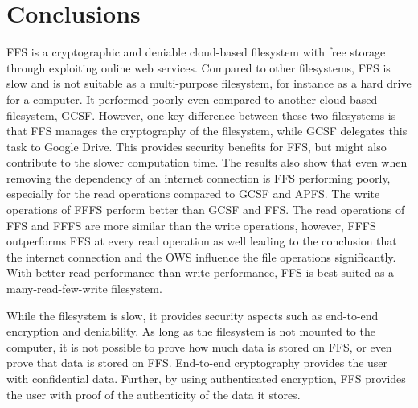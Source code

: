 
\section{Conclusions}
\label{sec:conclusions}
  


\gls{FFS} is a cryptographic and deniable \mbox{cloud-based} filesystem with free storage through exploiting online web services. Compared to other filesystems, \gls{FFS} is slow and is not suitable as a \mbox{multi-purpose} filesystem, for instance as a hard drive for a computer. It performed poorly even compared to another \mbox{cloud-based} filesystem, \gls{GCSF}. However, one key difference between these two filesystems is that \gls{FFS} manages the cryptography of the filesystem, while \gls{GCSF} delegates this task to Google Drive. This provides security benefits for \gls{FFS}, but might also contribute to the slower computation time. The results also show that even when removing the dependency of an internet connection is \gls{FFS} performing poorly, especially for the read operations compared to \gls{GCSF} and \gls{APFS}. The write operations of \gls{FFFS} perform better than \gls{GCSF} and \gls{FFS}. The read operations of \gls{FFS} and \gls{FFFS} are more similar than the write operations, however, \gls{FFFS} outperforms \gls{FFS} at every read operation as well leading to the conclusion that the internet connection and the \gls{OWS} influence the file operations significantly. With better read performance than write performance, \gls{FFS} is best suited as a \mbox{many-read-few-write} filesystem.

While the filesystem is slow, it provides security aspects such as \mbox{end-to-end} encryption and deniability. As long as the filesystem is not mounted to the computer, it is not possible to prove how much data is stored on \gls{FFS}, or even prove that data is stored on \gls{FFS}. \mbox{End-to-end} cryptography provides the user with confidential data. Further, by using authenticated encryption, \gls{FFS} provides the user with proof of the authenticity of the data it stores. 